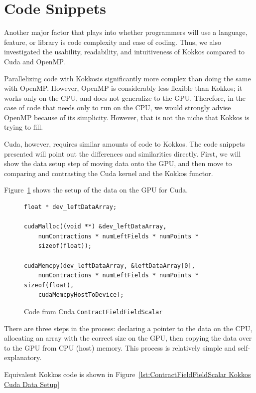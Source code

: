 \section{Code Snippets}
Another major factor that plays into whether programmers will use a language,
feature, or library is code complexity and ease of coding. Thus, we also
investigated the usability, readability, and intuitiveness of Kokkos compared to
Cuda and OpenMP.

Parallelizing code with Kokkosis significantly more complex than doing the same
with OpenMP.  However, OpenMP is considerably less flexible than Kokkos; it
works only on the CPU, and does not generalize to the GPU.  Therefore, in the
case of code that needs only to run on the CPU, we would strongly advise OpenMP
because of its simplicity.  However, that is not the niche that Kokkos is trying
to fill. 

Cuda, however, requires similar amounts of code to Kokkos.  The code snippets
presented will point out the differences and similarities directly.  First, we
will show the data setup step of moving data onto the GPU, and then move to
comparing and contrasting the Cuda kernel and the Kokkos functor.

Figure~\ref{lst:ContractFieldFieldScalar Cuda Data Setup} shows the setup of the data on the GPU for Cuda.

\begin{figure}[!htb]
	\begin{lstlisting}
float * dev_leftDataArray;

cudaMalloc((void **) &dev_leftDataArray, 
	numContractions * numLeftFields * numPoints * 
	sizeof(float));
	
cudaMemcpy(dev_leftDataArray, &leftDataArray[0], 
	numContractions * numLeftFields * numPoints * sizeof(float), 
	cudaMemcpyHostToDevice);
	\end{lstlisting}

\caption{Code from Cuda \texttt{ContractFieldFieldScalar}
\label{lst:ContractFieldFieldScalar Cuda Data Setup}}
\end{figure}

There are three steps in the process: declaring a pointer to the data on the
CPU, allocating an array with the correct size on the GPU, then copying the data
over to the GPU from CPU (host) memory. This process is relatively simple and
self-explanatory.

Equivalent Kokkos code is shown in Figure~\ref{lst:ContractFieldFieldScalar
Kokkos Cuda Data Setup}

